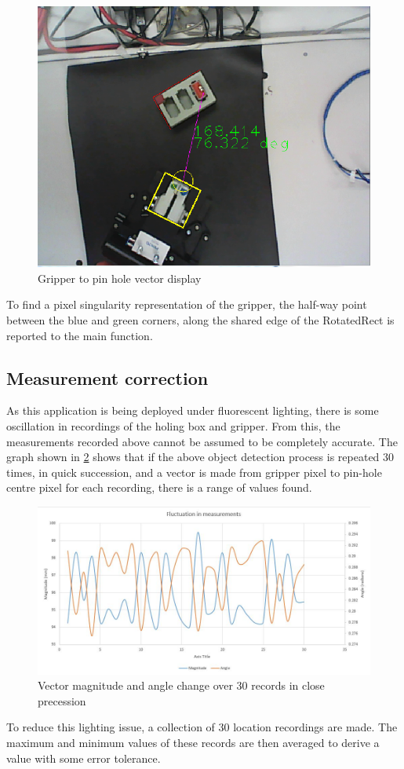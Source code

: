 \documentclass[11pt,a4paper]{report}
\begin{document}
\begin{figure}[h]
\centering
\includegraphics[width=0.5\linewidth]{vector}
\caption{Gripper to pin hole vector display}
\label{fig:vector}
\end{figure}
 \FloatBarrier
 
To find a pixel singularity representation of the gripper, the half-way point between the blue and green corners, along the shared edge of the RotatedRect is reported to the main function.\\


\subsection{Measurement correction} \label{mean}
As this application is being deployed under fluorescent lighting, there is some oscillation in recordings of the holing box and gripper. From this, the measurements recorded above cannot be assumed to be completely accurate. The graph shown in \cref{fig:measumrnetflux} shows that if the above object detection process is repeated 30 times, in quick succession, and a vector is made from gripper pixel to pin-hole centre pixel for each recording, there is a range of values found.\\ 

\begin{figure}[h]
\centering
\includegraphics[width=0.7\linewidth]{measumrnetflux}
\caption{Vector magnitude and angle change over 30 records in close precession}
\label{fig:measumrnetflux}
\end{figure}
To reduce this lighting issue, a collection of 30 location recordings are made. The maximum and minimum values of these records are then averaged to derive a value with some error tolerance. 
 
\end{document}
